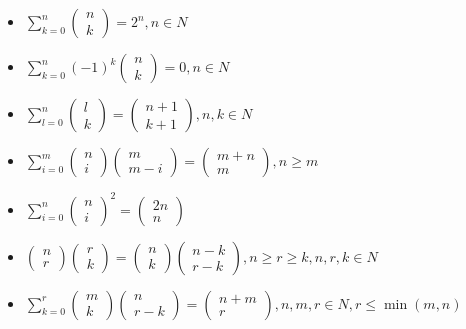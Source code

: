 \documentclass[twocolumn,10pt]{ctexart}
\begin{document}
\begin{itemize}
\item $\sum_{k=0}^n\begin{pmatrix}n\\k\end{pmatrix}=2^n,\allowbreak{}n\in N$
\item $\sum_{k=0}^n(-1)^k\begin{pmatrix}n\\k\end{pmatrix}=0,\allowbreak{}n\in N$
\item $\sum_{l=0}^n\begin{pmatrix}l\\k\end{pmatrix}=\begin{pmatrix}n+1\\k+1\end{pmatrix},\allowbreak{}n,\allowbreak{}k\in N$
\item $\sum_{i=0}^m\begin{pmatrix}n\\i\end{pmatrix}\begin{pmatrix}m\\m-i\end{pmatrix}=\begin{pmatrix}m+n\\m\end{pmatrix},\allowbreak{}n\ge m$
\item $\sum_{i=0}^n\begin{pmatrix}n\\i\end{pmatrix}^2=\begin{pmatrix}2n\\n\end{pmatrix}$
\item $\begin{pmatrix}n\\r\end{pmatrix}\begin{pmatrix}r\\k\end{pmatrix}=\begin{pmatrix}n\\k\end{pmatrix}\begin{pmatrix}n-k\\r-k\end{pmatrix},\allowbreak{}n\ge r\ge k,\allowbreak{}n,\allowbreak{}r,\allowbreak{}k\in N$
\item $\sum_{k=0}^r\begin{pmatrix}m\\k\end{pmatrix}\begin{pmatrix}n\\r-k\end{pmatrix}=\begin{pmatrix}n+m\\r\end{pmatrix},\allowbreak{}n,\allowbreak{}m,\allowbreak{}r\in N,\allowbreak{}r\le\min(m,\allowbreak{}n)$

\end{itemize}
\end{document}
